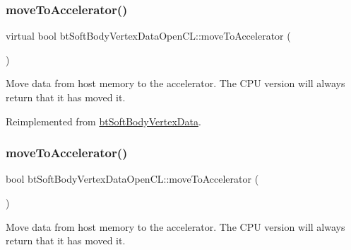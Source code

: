 \mbox{\label{classbtSoftBodyVertexDataOpenCL_ad30e5afe5e81dbf16af8b10cdcd54044}} 
\subsubsection{\texorpdfstring{move\+To\+Accelerator()}{moveToAccelerator()}\hspace{0.1cm}{\footnotesize\ttfamily [1/2]}}
{\footnotesize\ttfamily virtual bool bt\+Soft\+Body\+Vertex\+Data\+Open\+C\+L\+::move\+To\+Accelerator (\begin{DoxyParamCaption}{ }\end{DoxyParamCaption})\hspace{0.3cm}{\ttfamily [virtual]}}

Move data from host memory to the accelerator. The C\+PU version will always return that it has moved it. 

Reimplemented from \hyperlink{classbtSoftBodyVertexData_a2d3f04a5b2461bf95beca6f3fc48e28b}{bt\+Soft\+Body\+Vertex\+Data}.

\mbox{\label{classbtSoftBodyVertexDataOpenCL_abd4012054faecf26669f00a04bfd6170}} 
\subsubsection{\texorpdfstring{move\+To\+Accelerator()}{moveToAccelerator()}\hspace{0.1cm}{\footnotesize\ttfamily [2/2]}}
{\footnotesize\ttfamily bool bt\+Soft\+Body\+Vertex\+Data\+Open\+C\+L\+::move\+To\+Accelerator (\begin{DoxyParamCaption}{ }\end{DoxyParamCaption})\hspace{0.3cm}{\ttfamily [virtual]}}

Move data from host memory to the accelerator. The C\+PU version will always return that it has moved it. 

